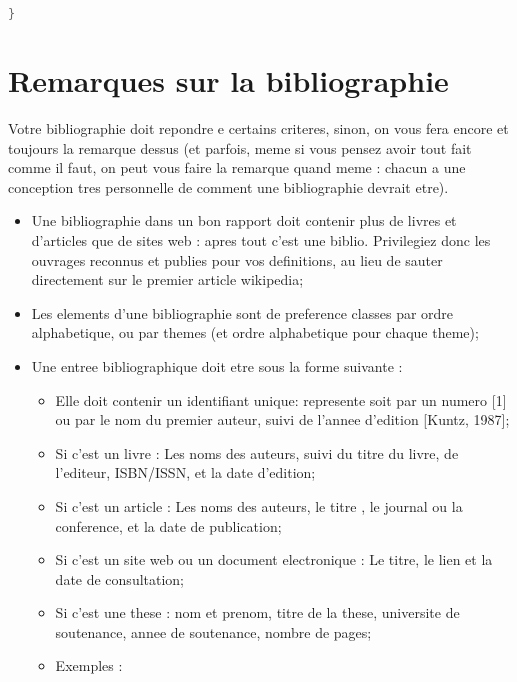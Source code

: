 \begin{spacing}{1.2}
\begin{lstlisting}[label=code:java,caption=Helloworld Java,language=java]
}
\end{lstlisting}

\section{Remarques sur la bibliographie}
Votre bibliographie doit repondre e certains criteres, sinon, on vous fera encore et
toujours la remarque dessus (et parfois, meme si vous pensez avoir tout fait comme il
 faut, on peut vous faire la remarque quand meme : chacun a une conception tres
personnelle de comment une bibliographie devrait etre).\\
\begin{itemize}
\item Une bibliographie dans un bon rapport doit contenir plus de livres et d'articles 
que de sites web : apres tout c'est une biblio. Privilegiez donc les ouvrages
reconnus et publies pour vos definitions, au lieu de sauter directement sur le premier article wikipedia;
 \item Les elements d'une bibliographie sont de preference classes par ordre
alphabetique, ou par themes (et ordre alphabetique pour chaque theme);
\item Une entree bibliographique doit etre sous la forme suivante :
\begin{itemize}
\item Elle doit contenir un identifiant unique: represente soit par un numero
[1] ou par le nom du premier auteur, suivi de l'annee d'edition [Kuntz, 1987];
\item Si c'est un livre : Les noms des auteurs, suivi du titre du livre, de l'editeur, 
ISBN/ISSN, et la date d'edition;
\item Si c'est un article : Les noms des auteurs, le titre , le journal ou la
conference, et la date de publication;
\item Si c'est un site web ou un document electronique : Le titre, le lien et la date 
de consultation;
\item Si c'est une these : nom et prenom, titre de la these, universite de
soutenance, annee de soutenance, nombre de pages;
\item Exemples : 
\end{itemize}
\end{itemize}
\end{spacing}
